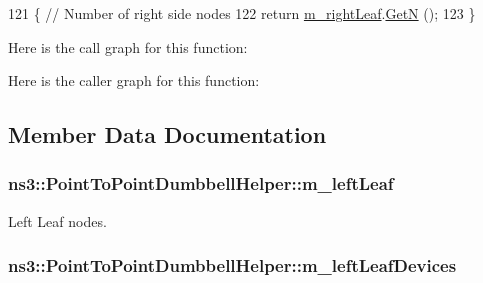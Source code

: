 \begin{DoxyCode}
121 \{ \textcolor{comment}{// Number of right side nodes}
122   \textcolor{keywordflow}{return} \hyperlink{classns3_1_1PointToPointDumbbellHelper_a68bce973bff75333cd89917b5350a9dd}{m\_rightLeaf}.\hyperlink{classns3_1_1NodeContainer_aed647ac56d0407a7706aba02eb44b951}{GetN} ();
123 \}
\end{DoxyCode}


Here is the call graph for this function\+:




Here is the caller graph for this function\+:




\subsection{Member Data Documentation}
\subsubsection[{\texorpdfstring{m\+\_\+left\+Leaf}{m_leftLeaf}}]{ ns3\+::\+Point\+To\+Point\+Dumbbell\+Helper\+::m\+\_\+left\+Leaf\hspace{0.3cm}{\ttfamily [private]}}\hypertarget{classns3_1_1PointToPointDumbbellHelper_adc3b5ba830d66a3afe4009138b567db0}{}\label{classns3_1_1PointToPointDumbbellHelper_adc3b5ba830d66a3afe4009138b567db0}


Left Leaf nodes. 

\subsubsection[{\texorpdfstring{m\+\_\+left\+Leaf\+Devices}{m_leftLeafDevices}}]{ ns3\+::\+Point\+To\+Point\+Dumbbell\+Helper\+::m\+\_\+left\+Leaf\+Devices\hspace{0.3cm}{\ttfamily [private]}}\hypertarget{classns3_1_1PointToPointDumbbellHelper_aa654e18b9487a3a3bf8ac96babc0caa2}{}\label{classns3_1_1PointToPointDumbbellHelper_aa654e18b9487a3a3bf8ac96babc0caa2}


